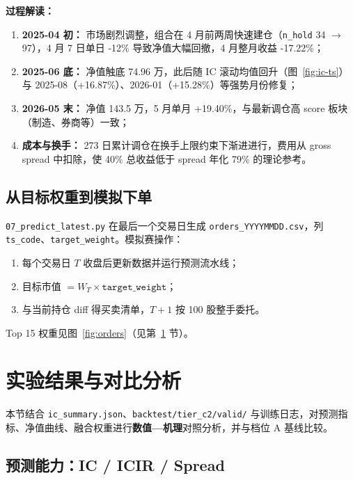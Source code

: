 \documentclass[UTF8,a4paper,12pt]{ctexart}
\begin{document}
\textbf{过程解读：}
\begin{enumerate}[leftmargin=2em]
  \item \textbf{2025-04 初：} 市场剧烈调整，组合在 4 月前两周快速建仓（\texttt{n\_hold} 34 $\to$ 97），4 月 7 日单日 -12\% 导致净值大幅回撤，4 月整月收益 -17.22\%；
  \item \textbf{2025-06 底：} 净值触底 74.96 万，此后随 IC 滚动均值回升（图~\ref{fig:ic-ts}）与 2025-08（+16.87\%）、2026-01（+15.28\%）等强势月份修复；
  \item \textbf{2026-05 末：} 净值 143.5 万，5 月单月 +19.40\%，与最新调仓高 score 板块（制造、券商等）一致；
  \item \textbf{成本与换手：} 273 日累计调仓在换手上限约束下渐进进行，费用从 gross spread 中扣除，使 40\% 总收益低于 spread 年化 79\% 的理论参考。
\end{enumerate}

\subsection{从目标权重到模拟下单}

\texttt{07\_predict\_latest.py} 在最后一个交易日生成 \texttt{orders\_YYYYMMDD.csv}，列 \texttt{ts\_code}、\texttt{target\_weight}。模拟赛操作：
\begin{enumerate}[leftmargin=2em]
  \item 每个交易日 $T$ 收盘后更新数据并运行预测流水线；
  \item 目标市值 $= W_T \times \texttt{target\_weight}$；
  \item 与当前持仓 diff 得买卖清单，$T\!+\!1$ 按 100 股整手委托。
\end{enumerate}
Top 15 权重见图~\ref{fig:orders}（见第~\ref{sec:results} 节）。


\section{实验结果与对比分析}
\label{sec:results}

本节结合 \texttt{ic\_summary.json}、\texttt{backtest/tier\_c2/valid/} 与训练日志，对预测指标、净值曲线、融合权重进行\textbf{数值—机理}对照分析，并与档位 A 基线比较。

\subsection{预测能力：IC / ICIR / Spread}
\end{document}
